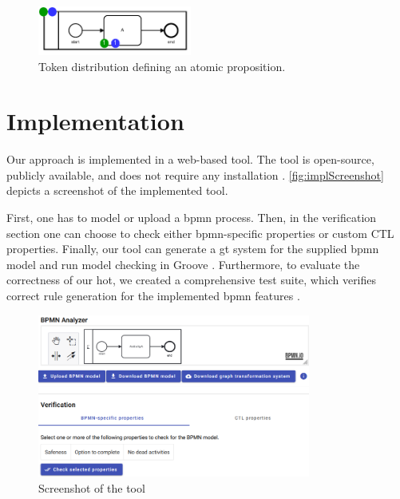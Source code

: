 \documentclass[runningheads]{llncs}
\begin{document}
\begin{figure}[ht]
    \centering
    \includegraphics[width=0.45\textwidth]{images/bpmn_semantics-atomic-proposition.pdf}
    \caption{Token distribution defining an atomic proposition.}
    \label{fig:atomicProposition}
\end{figure}


\section{Implementation} \label{sec:impl}

Our approach is implemented in a web-based tool.
The tool is open-source, publicly available, and does not require any installation \cite{krauterArtifactsICGT2023}.
\autoref{fig:implScreenshot} depicts a screenshot of the implemented tool.

First, one has to model or upload a \gls*{bpmn} process.
Then, in the verification section one can choose to check either \gls*{bpmn}-specific properties or custom CTL properties.
Finally, our tool can generate a \gls*{gt} system for the supplied \gls*{bpmn} model and run model checking in Groove \cite{kastenbergModelCheckingDynamic2006}.
Furthermore, to evaluate the correctness of our \gls*{hot}, we created a comprehensive test suite, which verifies correct rule generation for the implemented \gls*{bpmn} features \cite{krauterArtifactsICGT2023}.

\begin{figure}[ht]
    \centering
    \includegraphics[width=0.8\textwidth]{images/impl_very_short.png}
    \caption{Screenshot of the tool}
    \label{fig:implScreenshot}
\end{figure}
\end{document}
